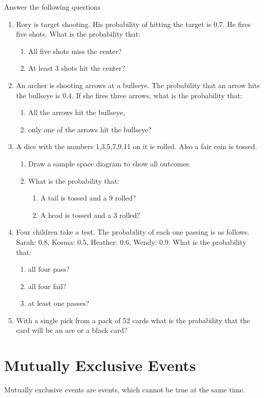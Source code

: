 \documentclass[10pt,a4paper,titlepage,twoside,openright]{report}
\begin{document}
{Answer the following questions}
{
\begin{enumerate}
\item Rory is target shooting. His probability of hitting the target is 0.7. He fires five shots. What is the probability that: 
	\begin{enumerate}
	\item All five shots miss the center?
	\item At least 3 shots hit the center? 
	\end{enumerate}
\item An archer is shooting arrows at a bullseye. The probability that an arrow hits the bullseye is 0.4. If she fires three arrows, what is the probability that:
	\begin{enumerate} 
	\item All the arrows hit the bullseye, 
	\item only one of the arrows hit the bullseye? 
	\end{enumerate}
\item A dice with the numbers 1,3,5,7,9,11 on it is rolled. Also a fair coin is tossed.
	\begin{enumerate} 
	\item Draw a sample space diagram to show all outcomes. 
	\item What is the probability that:
		\begin{enumerate} 
		\item A tail is tossed and a 9 rolled? 
		\item A head is tossed and a 3 rolled?
		\end{enumerate}
	\end{enumerate} 
\item Four children take a test. The probability of each one passing is as follows. Sarah: 0.8, Kosma: 0.5, Heather: 0.6, Wendy: 0.9. What is the probability that:
	\begin{enumerate}  
	\item all four pass? 
	\item all four fail? 
	\item at least one passes?
	\end{enumerate} 
\item With a single pick from a pack of 52 cards what is the probability that the card will be an ace or a black card? 
\end{enumerate}
}

\section{Mutually Exclusive Events}
Mutually exclusive events are events, which cannot be true at the same time.
\end{document}
